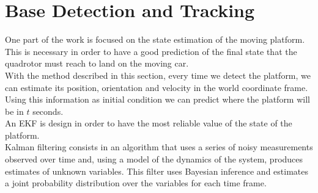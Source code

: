 \chapter{Base Detection and Tracking}\label{chap:base_tracking}
One part of the work is focused on the state estimation of the moving platform. This is necessary in order to have a good prediction of the final state that the quadrotor must reach to land on the moving car. \\ 
With the method described in this section, every time we detect the platform, we can estimate its position, orientation and velocity in the world coordinate frame. Using this information as initial condition we can predict where the platform will be in $t$ seconds.\\
An EKF  \cite{kalmanfilter} is design in order to have the most reliable value of the state of the platform.\\

Kalman filtering consists in an algorithm that uses a series of noisy measurements observed over time and, using a model of  the dynamics of the system, produces estimates of unknown variables. This filter uses Bayesian inference and estimates a joint probability distribution over the variables for each time frame.\\

